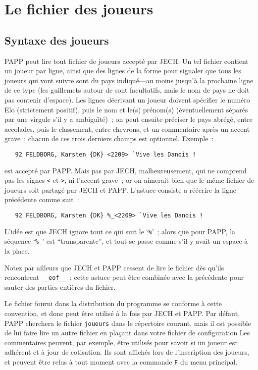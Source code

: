 \documentclass[10pt]{article}
\begin{document}
\section{Le fichier des joueurs}

\subsection{Syntaxe des joueurs}

	PAPP peut lire tout fichier de joueurs accepté par JECH. Un tel
fichier contient un joueur par ligne, ainsi que des lignes de la forme
\medbreak
{}
\medbreak
\noindent pour signaler que tous les joueurs qui vont suivre sont du pays
indiqué---au moins jusqu'à la prochaine ligne de ce type (les
guillemets autour de  sont facultatifs, mais le nom de
pays ne doit pas contenir d'espace).  Les lignes décrivant un joueur
doivent spécifier le numéro Elo (strictement positif), puis le nom
et le(s) prénom(s) (éventuellement séparés par une virgule s'il y a
ambigu{\"\i}té)~; on peut ensuite préciser le pays abrégé, entre
accolades, puis le classement, entre chevrons, et un commentaire après
un accent grave~; chacun de ces trois derniers champs est optionnel. 
Exemple~:
\begin{verbatim}
   92 FELDBORG, Karsten {DK} <2209> `Vive les Danois !
\end{verbatim}
est accepté par PAPP.  Mais pas par JECH, malheureusement, qui ne
comprend pas les signes \verb|<| et \verb|>|, ni l'accent grave~; or on
aimerait bien que le même fichier de joueurs soit partagé par JECH
et PAPP.  L'astuce consiste a réécrire la ligne précédente comme
suit~:
\begin{verbatim}
   92 FELDBORG, Karsten {DK} %_<2209> `Vive les Danois !
\end{verbatim}

	L'idée est que JECH ignore tout ce qui suit le `\verb|%|'~; alors
que pour PAPP, la séquence `\verb|%_|' est ``transparente'', et tout se
passe comme s'il y avait un espace à la place. 

	Notez par ailleurs que JECH et PAPP cessent de lire le fichier
dès qu'ils rencontrent \verb|__eof__|~; cette astuce peut être
combinée avec la précédente pour sauter des parties entières du
fichier. 

	Le fichier fourni dans la distribution du programme se conforme
à cette convention, et donc peut être utilisé à la fois par JECH
et PAPP.  Par défaut, PAPP cherchera le fichier \verb|joueurs| dans le
répertoire courant, mais il est possible de lui faire lire un autre
fichier en pla\c cant dans votre fichier de configuration
\medbreak
{}
\medbreak
    Les commentaires peuvent, par exemple, être utilisés pour
savoir si un joueur est adhérent et à jour de cotisation.  Ils sont
affichés lors de l'inscription des joueurs, et peuvent être relus
à tout moment avec la commande \verb|F| du menu principal.
\end{document}
